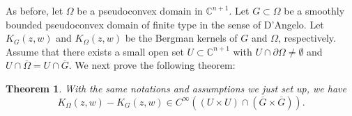 \documentclass[a4paper,centertags,oneside,12pt]{amsart}
\newcommand{\CC}{\mathbb C}
\newcommand{\pr}{\partial}
\newtheorem{theorem}{Theorem}[section]
\numberwithin{equation}{section}
\begin{document}
As before, let $\Omega$ be a pseudoconvex domain in $\CC^{n+1}$. Let $G\subset \Omega$ be a smoothly  bounded  pseudoconvex domain of finite type in the sense of D'Angelo. Let $K_{G}(z, w)$ and $K_{\Omega}(z, w)$ be the Bergman kernels of $G$ and $\Omega$, respectively. Assume that there exists a small open set $ U\subset\mathbb C^{n+1}$ with $U\cap\pr\Omega\neq\emptyset$ and $U\cap\overline\Omega=U\cap\overline G$.
We next   prove  the following theorem:
\begin{theorem}\label{t-gue251231ycdb}
With the same notations and assumptions  we just set up, we have
    \begin{equation}\label{12-8-a1}
        K_{\Omega}(z, w)-K_G(z, w)\in C^\infty((U\times U)\cap(\overline G\times\overline G)).
    \end{equation}
\end{theorem}
\end{document}
